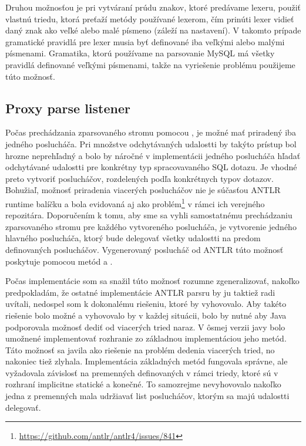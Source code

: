 Druhou možnosťou je pri vytváraní prúdu znakov, ktoré predávame lexeru, použiť vlastnú triedu, ktorá preťaží metódy používané lexerom, čím prinúti lexer vidieť daný znak ako veľké alebo malé písmeno (záleží na nastavení). V takomto prípade gramatické pravidlá pre lexer musia byť definované iba veľkými alebo malými písmenami. Gramatika, ktorú používame na parsovanie MySQL má všetky pravidlá definované veľkými písmenami, takže na vyriešenie problému použijeme túto možnosť. 

\subsection{Proxy parse listener}
Počas prechádzania zparsovaného stromu pomocou , je možné mať priradený iba jedného poslucháča. Pri množstve odchytávaných udalostti by takýto prístup bol hrozne neprehľadný a bolo by náročné v implementácii jedného poslucháča hľadať odchytávané udalostti pre konkrétny typ spracovavaného SQL dotazu. Je vhodné preto vytvoriť poslucháčov, rozdelených podľa konkrétnych typov dotazov. Bohužiaľ, možnosť priradenia viacerých poslucháčov nie je súčasťou ANTLR runtime balíčku a bola evidovaná aj ako problém\footnote{\url{https://github.com/antlr/antlr4/issues/841}} v rámci ich verejného repozitára. Doporučením k tomu, aby sme sa vyhli samostatnému prechádzaniu zparsovaného stromu pre každého vytvoreného poslucháča, je vytvorenie jedného hlavného poslucháča, ktorý bude delegovať všetky udalostti na predom definovaných poslucháčov. Vygenerovaný poslucháč od ANTLR túto možnosť poskytuje pomocou metód  a .

Počas implementácie som sa snažil túto možnosť rozumne zgeneralizovať, nakoľko predpokladám, že ostatné implementácie ANTLR parsru by ju taktiež radi uvítali, nedospel som k dokonalému riešeniu, ktoré by vyhovovalo. Aby takéto riešenie bolo možné a vyhovovalo by v každej situácii, bolo by nutné aby Java podporovala možnosť dediť od viacerých tried naraz. V ôsmej verzii javy bolo umožnené implementovať rozhranie zo základnou implementáciou jeho metód. Táto možnosť sa javila ako riešenie na problém dedenia viacerých tried, no nakoniec tiež zlyhala. Implementácia základných metód fungovala správne, ale vyžadovala závislosť na premenných definovaných v rámci triedy, ktoré sú v rozhraní implicitne statické a konečné. To samozrejme nevyhovovalo nakoľko jedna z premenných mala udržiavať list poslucháčov, ktorým sa majú udalostti delegovať.

